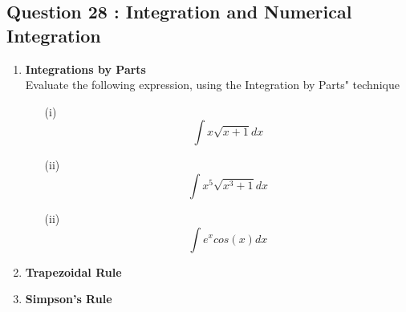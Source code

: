 \documentclass[]{article}
\begin{document}
		\subsection*{Question 28 : Integration and Numerical Integration}
		
		\begin{enumerate}
			\item \textbf{Integrations by Parts} \\ Evaluate the following expression, using the Integration by Parts" technique
			
			
			\begin{itemize}
				\item[(i)] \[ \int x \sqrt{x+1} dx \]
				\item[(ii)] \[ \int x^5 \sqrt{x^3+1} dx \]
				\item[(ii)] \[ \int e^x cos(x) dx \]
			\end{itemize}
			\item \textbf{Trapezoidal Rule}
			\item \textbf{Simpson's Rule}
		\end{enumerate}
		
		
		
\end{document}

